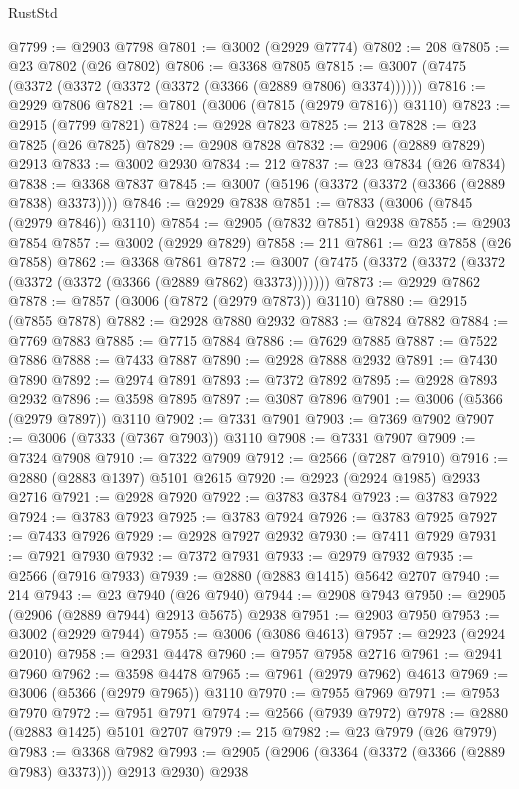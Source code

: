 \begin{lexlean}{RustStd}
\begin{coremodule}
{\begin{coremodule}
{{{{{{{{{{{{{{{{{{{{{{{{{{{{{{{{{{{{{{{{{{{{{{{{{{{{{{{{{{{{{{{{{{{{{{{{{{{{{{@7799 := @2903 @7798
@7801 := @3002 (@2929 @7774)
@7802 := 208
@7805 := @23 @7802 (@26 @7802)
@7806 := @3368 @7805
@7815 := @3007 (@7475 (@3372 (@3372 (@3372 (@3372 (@3366 (@2889 @7806) @3374))))))
@7816 := @2929 @7806
@7821 := @7801 (@3006 (@7815 (@2979 @7816)) @3110)
@7823 := @2915 (@7799 @7821)
@7824 := @2928 @7823
@7825 := 213
@7828 := @23 @7825 (@26 @7825)
@7829 := @2908 @7828
@7832 := @2906 (@2889 @7829) @2913
@7833 := @3002 @2930
@7834 := 212
@7837 := @23 @7834 (@26 @7834)
@7838 := @3368 @7837
@7845 := @3007 (@5196 (@3372 (@3372 (@3366 (@2889 @7838) @3373))))
@7846 := @2929 @7838
@7851 := @7833 (@3006 (@7845 (@2979 @7846)) @3110)
@7854 := @2905 (@7832 @7851) @2938
@7855 := @2903 @7854
@7857 := @3002 (@2929 @7829)
@7858 := 211
@7861 := @23 @7858 (@26 @7858)
@7862 := @3368 @7861
@7872 := @3007 (@7475 (@3372 (@3372 (@3372 (@3372 (@3372 (@3366 (@2889 @7862) @3373)))))))
@7873 := @2929 @7862
@7878 := @7857 (@3006 (@7872 (@2979 @7873)) @3110)
@7880 := @2915 (@7855 @7878)
@7882 := @2928 @7880 @2932
@7883 := @7824 @7882
@7884 := @7769 @7883
@7885 := @7715 @7884
@7886 := @7629 @7885
@7887 := @7522 @7886
@7888 := @7433 @7887
@7890 := @2928 @7888 @2932
@7891 := @7430 @7890
@7892 := @2974 @7891
@7893 := @7372 @7892
@7895 := @2928 @7893 @2932
@7896 := @3598 @7895
@7897 := @3087 @7896
@7901 := @3006 (@5366 (@2979 @7897)) @3110
@7902 := @7331 @7901
@7903 := @7369 @7902
@7907 := @3006 (@7333 (@7367 @7903)) @3110
@7908 := @7331 @7907
@7909 := @7324 @7908
@7910 := @7322 @7909
@7912 := @2566 (@7287 @7910)
@7916 := @2880 (@2883 @1397) @5101 @2615
@7920 := @2923 (@2924 @1985) @2933 @2716
@7921 := @2928 @7920
@7922 := @3783 @3784
@7923 := @3783 @7922
@7924 := @3783 @7923
@7925 := @3783 @7924
@7926 := @3783 @7925
@7927 := @7433 @7926
@7929 := @2928 @7927 @2932
@7930 := @7411 @7929
@7931 := @7921 @7930
@7932 := @7372 @7931
@7933 := @2979 @7932
@7935 := @2566 (@7916 @7933)
@7939 := @2880 (@2883 @1415) @5642 @2707
@7940 := 214
@7943 := @23 @7940 (@26 @7940)
@7944 := @2908 @7943
@7950 := @2905 (@2906 (@2889 @7944) @2913 @5675) @2938
@7951 := @2903 @7950
@7953 := @3002 (@2929 @7944)
@7955 := @3006 (@3086 @4613)
@7957 := @2923 (@2924 @2010)
@7958 := @2931 @4478
@7960 := @7957 @7958 @2716
@7961 := @2941 @7960
@7962 := @3598 @4478
@7965 := @7961 (@2979 @7962) @4613
@7969 := @3006 (@5366 (@2979 @7965)) @3110
@7970 := @7955 @7969
@7971 := @7953 @7970
@7972 := @7951 @7971
@7974 := @2566 (@7939 @7972)
@7978 := @2880 (@2883 @1425) @5101 @2707
@7979 := 215
@7982 := @23 @7979 (@26 @7979)
@7983 := @3368 @7982
@7993 := @2905 (@2906 (@3364 (@3372 (@3366 (@2889 @7983) @3373))) @2913 @2930) @2938
}}}}}}}}}}}}}}}}}}}}}}}}}}}}}}}}}}}}}}}}}}}}}}}}}}}}}}}}}}}}}}}}}}}}}}}}}}}}}}
\end{coremodule}}
\end{coremodule}
\end{lexlean}
